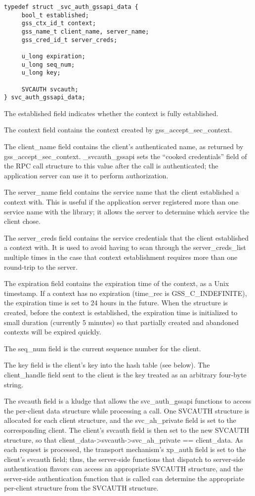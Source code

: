 \begin{verbatim}
typedef struct _svc_auth_gssapi_data {
     bool_t established;
     gss_ctx_id_t context;
     gss_name_t client_name, server_name;
     gss_cred_id_t server_creds;

     u_long expiration;
     u_long seq_num;
     u_long key;

     SVCAUTH svcauth;
} svc_auth_gssapi_data;
\end{verbatim}

The established field indicates whether the context is fully
established.

The context field contains the context created by
gss_accept_sec_context.

The client_name field contains the client's authenticated name, as
returned by gss_accept_sec_context.  _svcauth_gssapi sets the ``cooked
credentials'' field of the RPC call structure to this value after the
call is authenticated; the application server can use it to perform
authorization.

The server_name field contains the service name that the client
established a context with.  This is useful if the application server
registered more than one service name with the library; it allows the
server to determine which service the client chose.

The server_creds field contains the service credentials that the
client established a context with.  It is used to avoid having to scan
through the server_creds_list multiple times in the case that context
establishment requires more than one round-trip to the server.

The expiration field contains the expiration time of the context, as a
Unix timestamp.  If a context has no expiration (time_rec is
GSS_C_INDEFINITE), the expiration time is set to 24 hours in the
future.  When the structure is created, before the context is
established, the expiration time is initialized to small duration
(currently 5 minutes) so that partially created and abandoned contexts
will be expired quickly.

The seq_num field is the current sequence number for the client.

The key field is the client's key into the hash table (see below).
The client_handle field sent to the client is the key treated as an
arbitrary four-byte string.

The svcauth field is a kludge that allows the svc_auth_gssapi
functions to access the per-client data structure while processing a
call.  One SVCAUTH structure is allocated for each client structure,
and the svc_ah_private field is set to the corresponding client.  The
client's svcauth field is then set to the new SVCAUTH structure, so
that client_data->svcauth->svc_ah_private == client_data.  As each
request is processed, the transport mechanism's xp_auth field is set
to the client's svcauth field; thus, the server-side functions that
dispatch to server-side authentication flavors can access an
appropriate SVCAUTH structure, and the server-side authentication
function that is called can determine the appropriate per-client
structure from the SVCAUTH structure.

